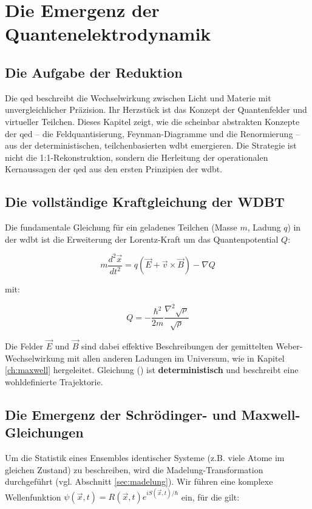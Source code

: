 \chapter{Die Emergenz der Quantenelektrodynamik}
\section{Die Aufgabe der Reduktion}
Die \gls{qed} beschreibt die Wechselwirkung zwischen Licht und Materie mit unvergleichlicher Präzision. Ihr Herzstück ist das Konzept der Quantenfelder und virtueller Teilchen. Dieses Kapitel zeigt,
wie die scheinbar abstrakten Konzepte der \gls{qed} – die Feldquantisierung, Feynman-Diagramme und die Renormierung – aus der deterministischen, teilchenbasierten \gls{wdbt} emergieren. Die Strategie
ist nicht die 1:1-Rekonstruktion, sondern die Herleitung der operationalen Kernaussagen der \gls{qed} aus den ersten Prinzipien der \gls{wdbt}.

\section{Die vollständige Kraftgleichung der WDBT}
Die fundamentale Gleichung für ein geladenes Teilchen (Masse $m$, Ladung $q$) in der \gls{wdbt} ist die Erweiterung der Lorentz-Kraft um das Quantenpotential $Q$:

\begin{equation}
    \label{eq:kraft_wdbt_em}
    m \frac{d^2\vec{x}}{dt^2} = q(\vec{E} + \vec{v} \times \vec{B}) - \nabla Q
\end{equation}

mit:

\begin{equation}
    \label{eq:quantenpotential_wdbt_em}
    Q = -\frac{\hbar^2}{2m} \frac{\nabla^2 \sqrt{\rho}}{\sqrt{\rho}}
\end{equation}

Die Felder $\vec{E}$ und $\vec{B}$ sind dabei effektive Beschreibungen der gemittelten Weber-Wechselwirkung mit allen anderen Ladungen im Universum, wie in Kapitel \ref{ch:maxwell} hergeleitet. Gleichung
() ist \textbf{deterministisch} und beschreibt eine wohldefinierte Trajektorie.

\newpage
\section{Die Emergenz der Schrödinger- und Maxwell-Gleichungen}
Um die Statistik eines Ensembles identischer Systeme (z.B. viele Atome im gleichen Zustand) zu beschreiben, wird die Madelung-Transformation durchgeführt (vgl. Abschnitt \ref{sec:madelung}). Wir führen
eine komplexe Wellenfunktion $\psi(\vec{x},t)=R(\vec{x},t)e^{iS(\vec{x},t)/\hbar}$ ein, für die gilt:

